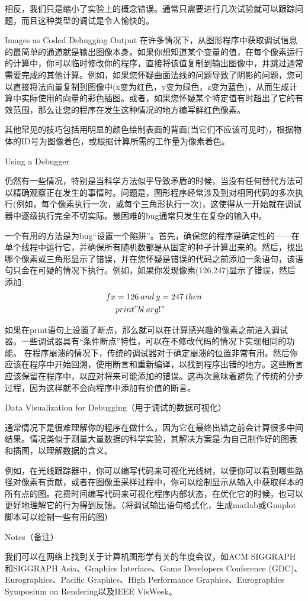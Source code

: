 相反，我们只是缩小了实验上的概念错误。通常只需要进行几次试验就可以跟踪问题，而且这种类型的调试是令人愉快的。

Images as Coded Debugging Output
在许多情况下，从图形程序中获取调试信息的最简单的通道就是输出图像本身。如果你想知道某个变量的值，在每个像素运行的计算中，你可以临时修改你的程序，直接将该值复制到输出图像中，并跳过通常需要完成的其他计算。例如，如果您怀疑曲面法线的问题导致了阴影的问题，您可以直接将法向量复制到图像中(x变为红色，y变为绿色，z变为蓝色)，从而生成计算中实际使用的向量的彩色插图。或者，如果您怀疑某个特定值有时超出了它的有效范围，那么让您的程序在发生这种情况的地方编写鲜红色像素。

其他常见的技巧包括用明显的颜色绘制表面的背面(当它们不应该可见时)，根据物体的ID号为图像着色，或根据计算所需的工作量为像素着色。

Using a Debugger

仍然有一些情况，特别是当科学方法似乎导致矛盾的时候，当没有任何替代方法可以精确观察正在发生的事情时。问题是，图形程序经常涉及到对相同代码的多次执行(例如，每个像素执行一次，或每个三角形执行一次)，这使得从一开始就在调试器中逐级执行完全不切实际。最困难的bug通常只发生在复杂的输入中。

一个有用的方法是为bug“设置一个陷阱”。首先，确保您的程序是确定性的——在单个线程中运行它，并确保所有随机数都是从固定的种子计算出来的。然后，找出哪个像素或三角形显示了错误，并在您怀疑是错误的代码之前添加一条语句，该语句只会在可疑的情况下执行。例如，如果你发现像素(126,247)显示了错误，然后添加:
\begin{equation}
	\begin{aligned}	
		fx &= 126\:and\:y=247\:then \\
		&print"bl\:arg!"
	\end{aligned}
\end{equation}

如果在print语句上设置了断点，那么就可以在计算感兴趣的像素之前进入调试器。一些调试器具有“条件断点”特性，可以在不修改代码的情况下实现相同的功能。
在程序崩溃的情况下，传统的调试器对于确定崩溃的位置非常有用。然后你应该在程序中开始回溯，使用断言和重新编译，以找到程序出错的地方。这些断言应该保留在程序中，以应对将来可能添加的错误。这再次意味着避免了传统的分步过程，因为这样就不会向程序中添加有价值的断言。

Data Visualization for Debugging（用于调试的数据可视化）

通常情况下是很难理解你的程序在做什么，因为它在最终出错之前会计算很多中间结果。情况类似于测量大量数据的科学实验，其解决方案是:为自己制作好的图表和插图，以理解数据的含义。

例如，在光线跟踪器中，你可以编写代码来可视化光线树，以便你可以看到哪些路径对像素有贡献，或者在图像重采样过程中，你可以绘制显示从输入中获取样本的所有点的图。花费时间编写代码来可视化程序内部状态，在优化它的时候，也可以更好地理解它的行为得到反馈。（将调试输出语句格式化，生成matlab或Gnuplot脚本可以绘制一些有用的图）

Notes（备注）

我们可以在网络上找到关于计算机图形学有关的年度会议，如ACM SIGGRAPH和SIGGRAPH Asia、Graphics Interface、Game Developers Conference (GDC)、Eurographics、Pacific Graphics、High Performance Graphics、Eurographics Symposium on Rendering以及IEEE VisWeek。




